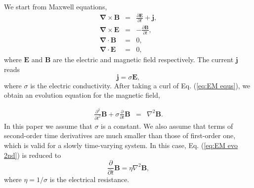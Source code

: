 \documentclass[english,aps,superscriptaddress,preprint]{revtex4-1}
\begin{document}
We start from Maxwell equations, 
\begin{eqnarray}
\boldsymbol{\nabla}\times\boldsymbol{B} & = & \frac{\partial\boldsymbol{E}}{\partial t}+\boldsymbol{j},\label{eq:EM equs}\\
\boldsymbol{\nabla}\times\boldsymbol{E} & = & -\frac{\partial\boldsymbol{B}}{\partial t},\label{eq:EM equs-1}\\
\boldsymbol{\nabla}\cdot\boldsymbol{B} & = & 0,\label{eq:EM equs-2}\\
\boldsymbol{\nabla}\cdot\boldsymbol{E} & = & 0,\label{eq:EM equs-3}
\end{eqnarray}
where $\boldsymbol{E}$ and $\boldsymbol{B}$ are the electric and
magnetic field respectively. The current $\boldsymbol{j}$ reads 
\begin{equation}
\boldsymbol{j}=\sigma\boldsymbol{E},\label{eq:current eqns}
\end{equation}
where $\sigma$ is the electric conductivity. After taking a curl
of Eq. (\ref{eq:EM equs}), we obtain an evolution equation for the
magnetic field, 

\begin{eqnarray}
\frac{\partial^{2}}{\partial t^{2}}\boldsymbol{B}+\sigma\frac{\partial}{\partial t}\boldsymbol{B} & = & \nabla^{2}\boldsymbol{B}.\label{eq:EM evo 2nd}
\end{eqnarray}
In this paper we assume that $\sigma$ is a constant. We also assume
that terms of second-order time derivatives are much smaller than
those of first-order one, which is valid for a slowly time-varying
system. In this case, Eq. (\ref{eq:EM evo 2nd}) is reduced to 
\begin{equation}
\frac{\partial}{\partial t}\boldsymbol{B}=\eta\nabla^{2}\boldsymbol{B},\label{eq:EM evo 1st-sim}
\end{equation}
where $\eta=1/\sigma$ is the electrical resistance.
\end{document}

